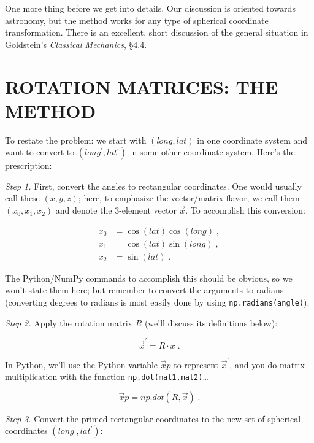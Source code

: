 \documentclass[]{article}
\begin{document}
    One more thing before we get into details. Our discussion is
oriented towards astronomy, but the method works for any type of
spherical coordinate transformation. There is an excellent, short
discussion of the general situation in Goldstein's {\it Classical
Mechanics}, \S 4.4.

\section {ROTATION MATRICES: THE METHOD}

    To restate the problem: we start with $(long, lat)$ in one
coordinate system and want to convert to $(long^\prime, lat^\prime)$ in some other
coordinate system. Here's the prescription:

    {\it Step 1.} First, convert the angles to rectangular
coordinates.  One would usually call these $(x, y, z)$; here, to
emphasize the vector/matrix flavor, we call them $(x_0, x_1, x_2)$ and
denote the 3-element vector ${\vec x}$.  To accomplish this conversion:

\begin{align}
x_0 &= \cos(lat) \cos(long) \; , \\
x_1 &= \cos(lat) \sin(long) \; , \\
x_2 &= \sin(lat) \; .
\end{align}

\noindent The Python/NumPy commands to accomplish this should be obvious, so we
won't state them here; but remember to convert the arguments to radians
(converting degrees to radians is most easily done by using 
{\tt np.radians(angle)}). 

    {\it Step 2.} Apply the rotation matrix ${R}$ (we'll discuss its
definitions below): 

\begin{equation}
{\vec x^\prime} = {R \cdot x} \; .
\end{equation}

\noindent In Python, we'll use the Python variable ${\vec xp}$ to represent ${\vec
x^\prime}$, and you do matrix multiplication with the function {\tt np.dot(mat1,mat2)}\dots

\begin{equation}
{\vec xp} = np.dot(R,{\vec x}) \; .
\end{equation}

    {\it Step 3.} Convert the primed rectangular coordinates to the
new set of spherical coordinates $(long^\prime, lat^\prime)$:
\end{document}
